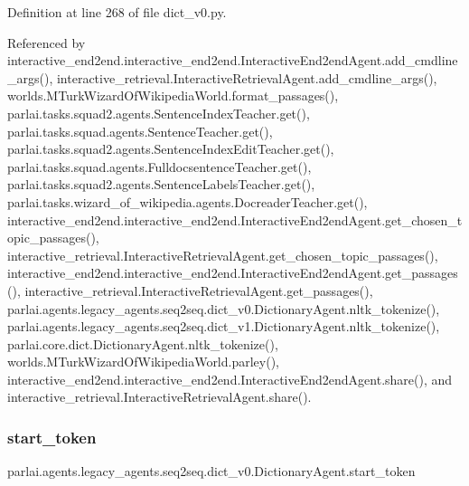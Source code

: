 Definition at line 268 of file dict\+\_\+v0.\+py.



Referenced by interactive\+\_\+end2end.\+interactive\+\_\+end2end.\+Interactive\+End2end\+Agent.\+add\+\_\+cmdline\+\_\+args(), interactive\+\_\+retrieval.\+Interactive\+Retrieval\+Agent.\+add\+\_\+cmdline\+\_\+args(), worlds.\+M\+Turk\+Wizard\+Of\+Wikipedia\+World.\+format\+\_\+passages(), parlai.\+tasks.\+squad2.\+agents.\+Sentence\+Index\+Teacher.\+get(), parlai.\+tasks.\+squad.\+agents.\+Sentence\+Teacher.\+get(), parlai.\+tasks.\+squad2.\+agents.\+Sentence\+Index\+Edit\+Teacher.\+get(), parlai.\+tasks.\+squad.\+agents.\+Fulldocsentence\+Teacher.\+get(), parlai.\+tasks.\+squad2.\+agents.\+Sentence\+Labels\+Teacher.\+get(), parlai.\+tasks.\+wizard\+\_\+of\+\_\+wikipedia.\+agents.\+Docreader\+Teacher.\+get(), interactive\+\_\+end2end.\+interactive\+\_\+end2end.\+Interactive\+End2end\+Agent.\+get\+\_\+chosen\+\_\+topic\+\_\+passages(), interactive\+\_\+retrieval.\+Interactive\+Retrieval\+Agent.\+get\+\_\+chosen\+\_\+topic\+\_\+passages(), interactive\+\_\+end2end.\+interactive\+\_\+end2end.\+Interactive\+End2end\+Agent.\+get\+\_\+passages(), interactive\+\_\+retrieval.\+Interactive\+Retrieval\+Agent.\+get\+\_\+passages(), parlai.\+agents.\+legacy\+\_\+agents.\+seq2seq.\+dict\+\_\+v0.\+Dictionary\+Agent.\+nltk\+\_\+tokenize(), parlai.\+agents.\+legacy\+\_\+agents.\+seq2seq.\+dict\+\_\+v1.\+Dictionary\+Agent.\+nltk\+\_\+tokenize(), parlai.\+core.\+dict.\+Dictionary\+Agent.\+nltk\+\_\+tokenize(), worlds.\+M\+Turk\+Wizard\+Of\+Wikipedia\+World.\+parley(), interactive\+\_\+end2end.\+interactive\+\_\+end2end.\+Interactive\+End2end\+Agent.\+share(), and interactive\+\_\+retrieval.\+Interactive\+Retrieval\+Agent.\+share().

\mbox{\label{classparlai_1_1agents_1_1legacy__agents_1_1seq2seq_1_1dict__v0_1_1DictionaryAgent_a7c79eed4e03f4cf9f9654cfa013fd36f}} 
\subsubsection{\texorpdfstring{start\+\_\+token}{start\_token}}
{\footnotesize\ttfamily parlai.\+agents.\+legacy\+\_\+agents.\+seq2seq.\+dict\+\_\+v0.\+Dictionary\+Agent.\+start\+\_\+token}



